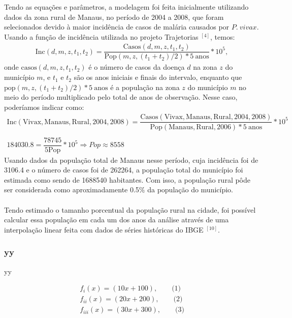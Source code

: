 \documentclass[12pt]{article}
\begin{document}
\newpage
Tendo as equações e parâmetros, a modelagem foi feita inicialmente utilizando dados da zona rural de Manaus, no período de 2004 a 2008, que foram selecionados devido à maior incidência de casos de malária causados por $P. \ vivax$. Usando a função de incidência utilizada no projeto Trajetorias $^{[4]}$, temos:
\begin{gather*}
    \text{Inc}(d, m, z, t_1, t_2) = \dfrac{\text{Casos}(d, m, z, t_1, t_2)}{\text{Pop}(m,z,(t_1+t_2)/2) * 5 \ \text{anos}} * 10^5,
\end{gather*}
onde $\text{casos}(d, m, z, t_1, t_2)$ é o número de casos da doença $d$ na zona $z$ do município $m$, e $t_1$ e $t_2$ são os anos iniciais e finais do intervalo, enquanto que $\text{pop}(m,z,(t_1+t_2)/2) * 5 \ \text{anos}$ é a população na zona $z$ do município $m$ no meio do período multiplicado pelo total de anos de observação. Nesse caso, poderíamos indicar como:
\begin{gather*}
    \text{Inc}(\text{Vivax}, \text{Manaus}, \text{Rural}, 2004, 2008) = \dfrac{\text{Casos}(\text{Vivax}, \text{Manaus}, \text{Rural}, 2004, 2008)}{\text{Pop}(\text{Manaus}, \text{Rural}, 2006) * 5 \ \text{anos}} * 10^5  \\\\
    184030.8 = \dfrac{78745}{5\text{Pop}} * 10^5 \Rightarrow Pop \approx 8558
\end{gather*}
Usando dados da população total de Manaus nesse período, cuja incidência foi de 3106.4 e o número de casos foi de 262264, a população total do município foi estimada como sendo de 1688540 habitantes. Com isso, a população rural pôde ser considerada como aproximadamente 0.5$\%$ da população do município.
\\\\
Tendo estimado o tamanho porcentual da população rural na cidade, foi possível calcular essa população em cada um dos anos da análise através de uma interpolação linear feita com dados de séries históricas do IBGE $^{[10]}$.

\newpage
\subsubsection{yy}

yy

\begin{align*}
f_{i}(x) = (10x + 100), \qquad \text{(1)} \tag{1}\\
f_{ii}(x) = (20x + 200), \qquad \text{(2)} \tag{2} \\
f_{iii}(x) = (30x + 300), \qquad \text{(3)} \tag{3} \\
\end{align*} %
\end{document}
